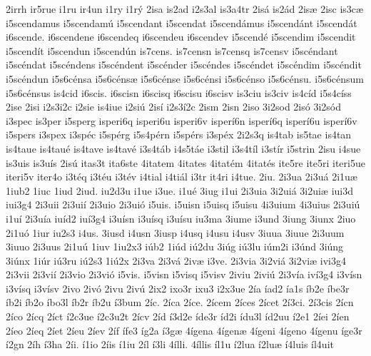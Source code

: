 {2irrh
ir5rue
i1ru
ir4un
i1ry
i1r^^fd
2isa
is2ad
i2s3al
is3a4tr
2is^^e1
is2^^e1d
2is^^e6
2isc
is3c^^e6
i5scendamus
i5scendam^^fa
i5scendant
i5scendat
i5scend^^e1mus
i5scend^^e1nt
i5scend^^e1t
i6scende.
i6scendene
i6scendeq
i6scendeu
i6scendev
i5scend^^e9
i5scendim
i5scendit
i5scend^^edt
i5scendun
i5scend^^fan
is7cens.
is7censn
is7censq
is7censv
i5sc^^e9ndant
i5sc^^e9ndat
i5sc^^e9ndens
i5sc^^e9ndent
i5sc^^e9nder
i5sc^^e9ndes
i5sc^^e9ndet
i5sc^^e9ndim
i5sc^^e9ndit
i5sc^^e9ndun
i5s6c^^e9nsa
i5s6c^^e9ns^^e6
i5s6c^^e9nse
i5s6c^^e9nsi
i5s6c^^e9nso
i5s6c^^e9nsu.
i5s6c^^e9nsum
i5s6c^^e9nsus
is4cid
i6scis.
i6scisn
i6scisq
i6scisu
i6scisv
is3ciu
is3civ
is4c^^edd
i5s4c^^edss
2ise
2isi
i2s3i2c
i2sie
is4iue
i2si^^fa
2is^^ed
i2s3^^ed2c
2ism
2isn
2iso
3i2sod
2is^^f3
3i2s^^f3d
i3spec
is3per
i5sperg
isperi6q
isperi6u
isperi6v
isper^^ed6n
isper^^ed6q
isper^^ed6u
isper^^ed6v
i5spers
i3spex
i3sp^^e9c
i5sp^^e9rg
i5s4p^^e9rn
i5sp^^e9rs
i3sp^^e9x
2i2s3q
is4tab
is5tae
is4tan
is4taue
is4tau^^e9
is4tave
is4tav^^e9
i3s4t^^e1b
i4s5t^^e1e
i3stil
i3s4t^^edl
i3st^^edr
i5strin
2isu
i4sue
is3uis
is3u^^eds
2is^^fa
itas3t
ita6ste
4itatem
4itates
4itat^^e9m
4itat^^e9s
ite5re
ite5ri
iteri5ue
iteri5v
iter4o
i3t^^e9q
i3t^^e9u
i3t^^e9v
i4tial
i4ti^^e1l
i3tr
it4ri
i4tue.
2iu.
2i3ua
2i3u^^e1
2i1u^^e6
1iub2
1iuc
1iud
2iud.
iu2d3u
i1ue
i3ue.
i1u^^e9
3iug
i1ui
2i3uia
3i2ui^^e1
3i2ui^^e6
iui3d
iui3g4
2i3uii
2i3ui^^ed
2i3uio
2i3ui^^f3
i5uis.
i5uisn
i5uisq
i5uisu
4i3uium
4i3uius
2i3ui^^fa
i1u^^ed
2i3u^^eda
iu^^edd2
iu^^ed3g4
i3u^^edsn
i3u^^edsq
i3u^^edsu
iu3ma
3iume
i3und
3iung
3iunx
2iuo
2i1u^^f3
1iur
iu2s3
i4us.
3iusd
i4usn
3iusp
i4usq
i4usu
i4usv
3iuua
3iuue
2i3uum
3iuuo
2i3uus
2i1u^^fa
1iuv
1iu2x3
i^^fab2
1i^^fad
i^^fa2du
3i^^fag
i^^fa3lu
i^^fam2i
i3^^fand
3i^^fang
3i^^fanx
1i^^far
i^^fa3ru
i^^fa2s3
1i^^fa2x
2i3va
2i3v^^e1
2iv^^e6
i3ve.
2i3via
3i2vi^^e1
3i2vi^^e6
ivi3g4
2i3vii
2i3vi^^ed
2i3vio
2i3vi^^f3
i5vis.
i5visn
i5visq
i5visv
2iviu
2ivi^^fa
2i3v^^eda
iv^^ed3g4
i3v^^edsn
i3v^^edsq
i3v^^edsv
2ivo
2iv^^f3
2ivu
2iv^^fa
2ix2
ixo3r
ixu3
i2x3ue
2^^eda
^^edad2
^^eda1s
^^edb2e
^^edbe3r
^^edb2i
^^edb2o
^^edbo3l
^^edb2r
^^edb2u
^^ed3bum
2^^edc.
2^^edca
2^^edce.
2^^edcem
2^^edces
2^^edcet
2^^ed3ci.
2^^ed3cis
2^^edcn
2^^edco
2^^edcq
2^^edct
^^ed2c3ue
^^ed2c3u2t
2^^edcv
2^^edd
^^ed3d2e
^^edde3r
^^edd2i
^^eddu3l
^^edd2uu
^^ed2e1
2^^edei
2^^eden
2^^edeo
2^^edeq
2^^edet
2^^edeu
2^^edev
2^^edf
^^edfe3
^^edg2a
^^ed3g^^e6
4^^edgena
4^^edgen^^e6
4^^edgeni
4^^edgeno
4^^edgenu
^^edge3r
^^ed2gn
2^^edh
^^ed3ha
2^^edi.
^^ed1io
2^^edis
^^ed1iu
2^^edl
^^ed3li
4^^edlli.
4^^edllis
^^edl1u
^^ed2lua
^^ed2lu^^e6
^^ed4luis
^^edl4uit
}
